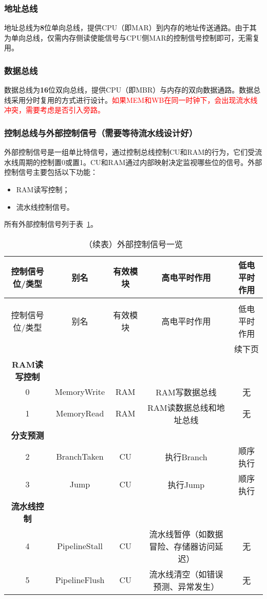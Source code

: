 \documentclass[lang=cn,a4paper,newtx]{elegantpaper}
\begin{document}
\subsubsection{地址总线}
地址总线为\textbf{8}位单向总线，提供CPU（即MAR）到内存的地址传送通路。由于其为单向总线，仅需内存侧读使能信号与CPU侧MAR的控制信号控制即可，无需复用。
\subsubsection{数据总线}
数据总线为\textbf{16}位双向总线，提供CPU（即MBR）与内存的双向数据通路。数据总线采用分时复用的方式进行设计。\textcolor{red}{如果MEM和WB在同一时钟下，会出现流水线冲突，需要考虑是否引入旁路。}
\subsubsection{控制总线与外部控制信号（需要等待流水线设计好）}
外部控制信号是一组单比特信号，通过控制总线控制CU和RAM的行为，它们受流水线周期的控制置0或置1。CU和RAM通过内部映射决定监视哪些位的信号。外部控制信号主要包括以下功能：
\begin{itemize}
  \item RAM读写控制；
  \item 流水线控制信号。
\end{itemize}

所有外部控制信号列于表~\ref{tab:CPU:ExternalControl}。
\begin{longtable}{c c c c c}
  \caption{外部控制信号一览} \label{tab:CPU:ExternalControl} \\
  \toprule
  控制信号位/类型 & 别名  & 有效模块 & 高电平时作用 & 低电平时作用\\
  \midrule
  \endfirsthead

  \caption[]{（续表）外部控制信号一览} \\
  \toprule
  控制信号位/类型 & 别名  & 有效模块 & 高电平时作用 & 低电平时作用 \\
  \midrule
  \endhead

  \midrule
  \multicolumn{5}{r}{续下页} \\
  \midrule
  \endfoot

  \bottomrule
  \endlastfoot
  \textbf{RAM读写控制}\\
  \hline
  0  & MemoryWrite    & RAM  & RAM写数据总线 & 无\\
  1  & MemoryRead     & RAM  & RAM读数据总线和地址总线 & 无\\
  \hline
  \textbf{分支预测} \\
  \hline
  2   & BranchTaken    & CU   & 执行Branch     & 顺序执行 \\
  3   & Jump            & CU  & 执行Jump        & 顺序执行 \\
  \hline
  \textbf{流水线控制}  \\
  \hline
  4   & PipelineStall & CU    & 流水线暂停（如数据冒险、存储器访问延迟） & 无 \\
  5   & PipelineFlush & CU    & 流水线清空（如错误预测、异常发生）      & 无 \\

\end{longtable}
\end{document}
